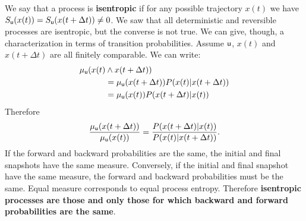 \documentclass[letterpaper]{article}
\begin{document}
We say that a process is \textbf{isentropic} if for any possible trajectory $x(t)$ we have $S_{\stmt[u]}(x(t)) = S_{\stmt[u]}(x(t + \Delta t)) \neq 0$. We saw that all deterministic and reversible processes are isentropic, but the converse is not true. We can give, though, a characterization in terms of transition probabilities. Assume $\stmt[u]$, $x(t)$ and $x(t+\Delta t)$ are all finitely comparable. We can write:
\begin{align*}
	\mu_{\stmt[u]}(x(t) &\AND x(t+\Delta t)) \\
	&=  \mu_{\stmt[u]}(x(t+\Delta t)) P(x(t)|x(t+\Delta t)) \\
	&=  \mu_{\stmt[u]}(x(t)) P(x(t+\Delta t)|x(t)) \\
\end{align*}
Therefore
\begin{equation}
\frac{\mu_{\stmt[u]}(x(t+\Delta t))}{\mu_{\stmt[u]}(x(t))} = \frac{P(x(t+\Delta t)|x(t))}{P(x(t)|x(t+\Delta t))}.
\end{equation}
If the forward and backward probabilities are the same, the initial and final snapshots have the same measure. Conversely, if the initial and final snapshot have the same measure, the forward and backward probabilities must be the same. Equal measure corresponds to equal process entropy. Therefore \textbf{isentropic processes are those and only those for which backward and forward probabilities are the same}.


\end{document}
